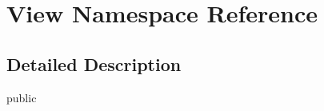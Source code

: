 \hypertarget{namespace_view}{}\section{View Namespace Reference}
\label{namespace_view}


\subsection{Detailed Description}
public 